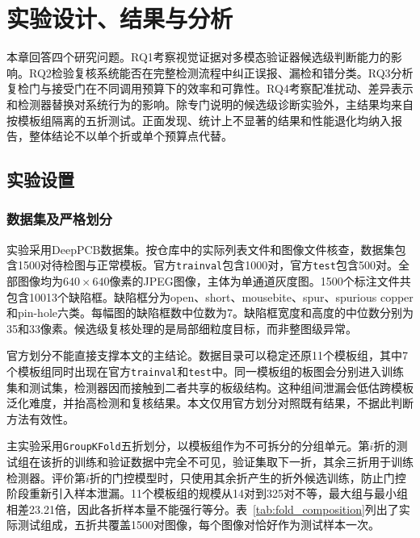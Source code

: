 \section{实验设计、结果与分析}
\label{sec:experiments}

本章回答四个研究问题。RQ1考察视觉证据对多模态验证器候选级判断能力的影响。RQ2检验复核系统能否在完整检测流程中纠正误报、漏检和错分类。RQ3分析复检门与接受门在不同调用预算下的效率和可靠性。RQ4考察配准扰动、差异表示和检测器替换对系统行为的影响。除专门说明的候选级诊断实验外，主结果均来自按模板组隔离的五折测试。正面发现、统计上不显著的结果和性能退化均纳入报告，整体结论不以单个折或单个预算点代替。

\subsection{实验设置}
\label{subsec:exp_setup}

\subsubsection{数据集及严格划分}

实验采用DeepPCB数据集\cite{tang2019deeppcb}。按仓库中的实际列表文件和图像文件核查，数据集包含1500对待检图与正常模板。官方\texttt{trainval}包含1000对，官方\texttt{test}包含500对。全部图像均为$640\times640$像素的JPEG图像，主体为单通道灰度图。1500个标注文件共包含10013个缺陷框。缺陷框分为open、short、mousebite、spur、spurious copper和pin-hole六类。每幅图的缺陷框数中位数为7。缺陷框宽度和高度的中位数分别为35和33像素。候选级复核处理的是局部细粒度目标，而非整图级异常。

官方划分不能直接支撑本文的主结论。数据目录可以稳定还原11个模板组，其中7个模板组同时出现在官方\texttt{trainval}和\texttt{test}中。同一模板组的板图会分别进入训练集和测试集，检测器因而接触到二者共享的板级结构。这种组间泄漏会低估跨模板泛化难度，并抬高检测和复核结果。本文仅用官方划分对照既有结果，不据此判断方法有效性。

主实验采用\texttt{GroupKFold}五折划分，以模板组作为不可拆分的分组单元。第$i$折的测试组在该折的训练和验证数据中完全不可见，验证集取下一折，其余三折用于训练检测器。评价第$i$折的门控模型时，只使用其余折产生的折外候选训练，防止门控阶段重新引入样本泄漏。11个模板组的规模从14对到325对不等，最大组与最小组相差23.21倍，因此各折样本量不能强行等分。表~\ref{tab:fold_composition}列出了实际测试组成，五折共覆盖1500对图像，每个图像对恰好作为测试样本一次。

